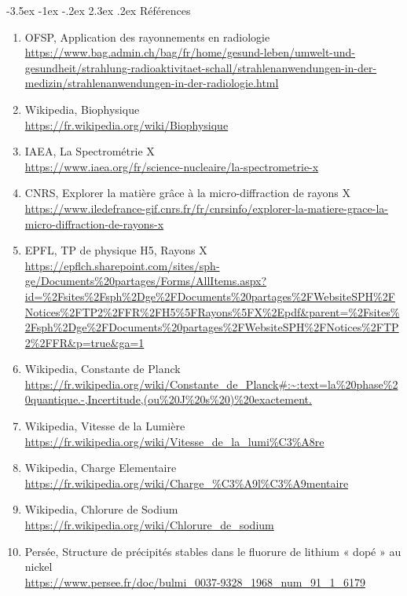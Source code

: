 \documentclass[a4paper, 12pt,oneside]{article}
\makeatletter
\renewcommand{\section}{\@startsection {section}{1}{\z@}%
             {-3.5ex \@plus -1ex \@minus -.2ex}%
             {2.3ex \@plus.2ex}%
             {\normalfont\normalsize\bfseries}}
\makeatother
\begin{document}
\section{Références}
\renewcommand{\labelenumi}{[\theenumi]}
\begin{enumerate}
    \item \label{ref1} OFSP, Application des rayonnements en radiologie\\
    \href{https://www.bag.admin.ch/bag/fr/home/gesund-leben/umwelt-und-gesundheit/strahlung-radioaktivitaet-schall/strahlenanwendungen-in-der-medizin/strahlenanwendungen-in-der-radiologie.html}{https://www.bag.admin.ch/bag/fr/home/gesund-leben/umwelt-und-gesundheit/strahlung-radioaktivitaet-schall/strahlenanwendungen-in-der-medizin/strahlenanwendungen-in-der-radiologie.html}
    \item \label{ref2} Wikipedia, Biophysique\\
    \href{https://fr.wikipedia.org/wiki/Biophysique}{https://fr.wikipedia.org/wiki/Biophysique}
    \item \label{ref3} IAEA, La Spectrométrie X\\
    \href{https://www.iaea.org/fr/science-nucleaire/la-spectrometrie-x}{https://www.iaea.org/fr/science-nucleaire/la-spectrometrie-x}
    \item \label{ref4} CNRS, Explorer la matière grâce à la micro-diffraction de rayons X\\
    \href{https://www.iledefrance-gif.cnrs.fr/fr/cnrsinfo/explorer-la-matiere-grace-la-micro-diffraction-de-rayons-x}{https://www.iledefrance-gif.cnrs.fr/fr/cnrsinfo/explorer-la-matiere-grace-la-micro-diffraction-de-rayons-x}
    \item \label{ref5} EPFL, TP de physique H5, Rayons X\\
    \url{https://epflch.sharepoint.com/sites/sph-ge/Documents%20partages/Forms/AllItems.aspx?id=%2Fsites%2Fsph%2Dge%2FDocuments%20partages%2FWebsiteSPH%2FNotices%2FTP2%2FFR%2FH5%5FRayons%5FX%2Epdf&parent=%2Fsites%2Fsph%2Dge%2FDocuments%20partages%2FWebsiteSPH%2FNotices%2FTP2%2FFR&p=true&ga=1}
    \item \label{ref6} Wikipedia, Constante de Planck\\
    \url{https://fr.wikipedia.org/wiki/Constante_de_Planck#:~:text=la%20phase%20quantique.-,Incertitude,(ou%20J%20s%20)%20exactement.}
    \item \label{ref7} Wikipedia, Vitesse de la Lumière\\
    \url{https://fr.wikipedia.org/wiki/Vitesse_de_la_lumi%C3%A8re}
    \item \label{ref8} Wikipedia, Charge Elementaire \\
    \url{https://fr.wikipedia.org/wiki/Charge_%C3%A9l%C3%A9mentaire}
    \item \label{ref9} Wikipedia, Chlorure de Sodium\\
    \url{https://fr.wikipedia.org/wiki/Chlorure_de_sodium}
    \item \label{ref10} Persée, Structure de précipités stables dans le fluorure de lithium « dopé » au nickel\\
    \url{https://www.persee.fr/doc/bulmi_0037-9328_1968_num_91_1_6179}
\end{enumerate}
\end{document}
